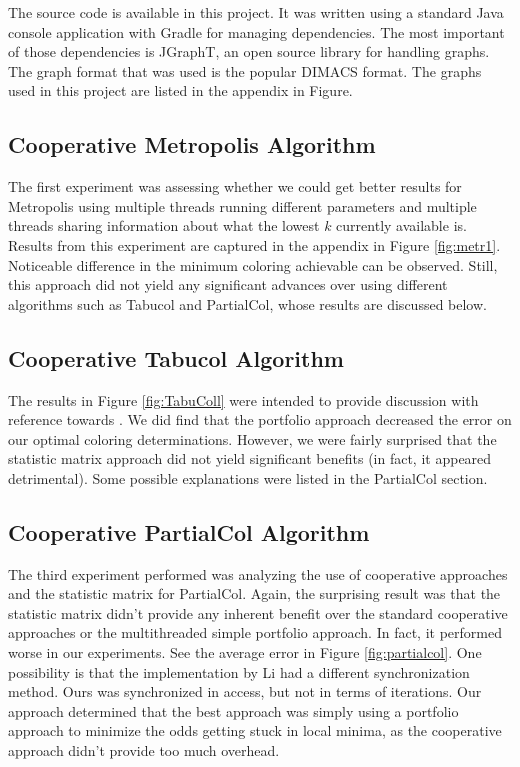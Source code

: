 \documentclass[runningheads]{llncs}
\begin{document}
The source code is available in this project. It was written using a standard Java console application with Gradle for managing dependencies. The most important of those dependencies is JGraphT, an open source library for handling graphs. The graph format that was used is the popular DIMACS format. The graphs used in this project are listed in the appendix in Figure.

\subsection{Cooperative Metropolis Algorithm}

The first experiment was assessing whether we could get better results for Metropolis using multiple threads running different parameters and multiple threads sharing information about what the lowest $k$ currently available is. Results from this experiment are captured in the appendix in Figure \ref{fig:metr1}. Noticeable difference in the minimum coloring achievable can be observed. Still, this approach did not yield any significant advances over using different algorithms such as Tabucol and PartialCol, whose results are discussed below.

\subsection{Cooperative Tabucol Algorithm}

The results in Figure \ref{fig:TabuColl} were intended to provide discussion with reference towards \cite{https://doi.org/10.5445/ir/1000083192}. We did find that the portfolio approach decreased the error on our optimal coloring determinations. However, we were fairly surprised that the statistic matrix approach did not yield significant benefits (in fact, it appeared detrimental). Some possible explanations were listed in the PartialCol section.

\subsection{Cooperative PartialCol Algorithm}

The third experiment performed was analyzing the use of cooperative approaches and the statistic matrix for PartialCol. Again, the surprising result was that the statistic matrix didn't provide any inherent benefit over the standard cooperative approaches or the multithreaded simple portfolio approach. In fact, it performed worse in our experiments. See the average error in Figure \ref{fig:partialcol}.
One possibility is that the implementation by Li had a different synchronization method. Ours was synchronized in access, but not in terms of iterations. Our approach determined that the best approach was simply using a portfolio approach to minimize the odds getting stuck in local minima, as the cooperative approach didn't provide too much overhead.
\end{document}
